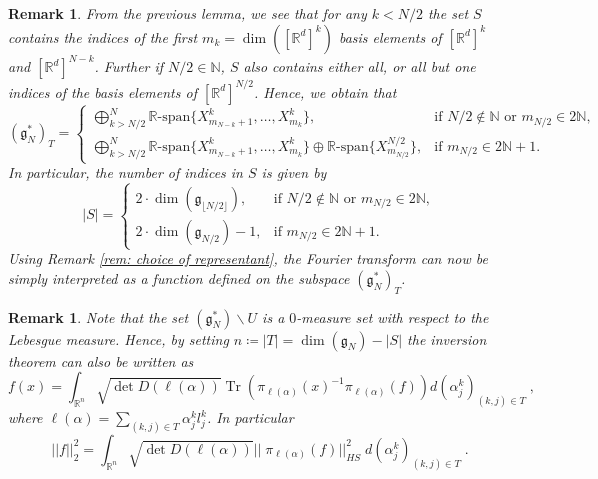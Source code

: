 \documentclass[pdflatex,sn-mathphys-num]{sn-jnl}
\theoremstyle{thmstyletwo}
\theoremstyle{thmstyleone}
\theoremstyle{thmstyletwo}
\newtheorem{remark}[definition]{Remark}
\newcommand{\fancyg}{\mathfrak{g}}
\newcommand{\R}{\mathbb{R}}
\begin{document}
		\begin{remark}\label{rem: dimension of S}
		From the previous lemma, we see that for any $k<N/2$ the set $S$ contains the indices of the first $m_k = \dim\left([\mathbb{R}^d]^k\right)$ basis elements of $[\mathbb{R}^d]^k$ and $[\mathbb{R}^d]^{N-k}$. Further if $N/2 \in \mathbb{N}$, $S$ also contains either all, or all but one indices of the basis elements of  $[\mathbb{R}^d]^{N/2}$. Hence, we obtain that
        \begin{equation*}
				(\fancyg_N^*)_T =
                    \begin{cases}
                    \displaystyle\bigoplus_{k > N/2}^N \R\text{-span}\{X_{m_{N-k}+1}^k, \ldots, X_{m_k}^k\}, 
                    & \text{if } N/2 \notin \mathbb{N} \text{ or } m_{N/2} \in 2\mathbb{N}, \\[1.5ex]
                    \displaystyle\bigoplus_{k > N/2}^N \R\text{-span}\{X_{m_{N-k}+1}^k, \ldots, X_{m_k}^k\} 
                    \oplus \R\text{-span}\{X_{m_{N/2}}^{N/2}\}, 
                    & \text{if } m_{N/2} \in 2\mathbb{N}+1.
                    \end{cases}
			\end{equation*}
		In particular, the number of indices in $S$ is given by
		\begin{equation*}\label{eq: number of element in S}
			|S| =
                \begin{cases}
                \displaystyle 2 \cdot \dim(\fancyg_{\lfloor N/2 \rfloor}), 
                & \text{if } N/2 \notin \mathbb{N} \text{ or } m_{N/2} \in 2\mathbb{N}, \\[1.2ex]
                \displaystyle 2 \cdot \dim(\fancyg_{N/2}) - 1, 
                & \text{if } m_{N/2} \in 2\mathbb{N} + 1.
                \end{cases}
		\end{equation*}
        Using Remark \ref{rem: choice of representant}, the Fourier transform can now be simply interpreted as a function defined on the subspace $(\fancyg_N^*)_T$.
        \end{remark}
		\begin{remark}
			Note that the set $(\fancyg_N^*)\backslash U$ is a $0$-measure set with respect to the Lebesgue measure. Hence, by setting $n \coloneqq |T| = \dim(\fancyg_{N})-|S|$ the inversion theorem can also be written as
			\[f(x) = \int_{\mathbb{R}^n}\sqrt{\operatorname{det}D(\ell(\alpha))}\operatorname{Tr}\left( \pi_{\ell(\alpha)}(x)^{-1}\pi_{\ell(\alpha)}(f)\right)d(\alpha_{j}^k)_{(k,j)\in T} \;,\]
			where $\ell(\alpha)= \sum_{(k,j)\in T}\alpha_j^kl_j^k$. In particular
			\[||f||_2^2 = \int_{\mathbb{R}^n}\sqrt{\operatorname{det}D(\ell(\alpha))}||\;\pi_{\ell(\alpha)}(f)||_{HS}^2\; d(\alpha_{j}^k)_{(k,j)\in T} \;.\]
		\end{remark}
\end{document}

